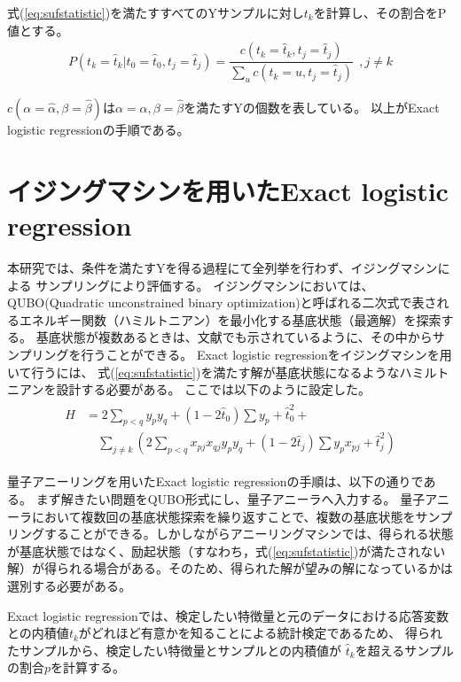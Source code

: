 \documentclass[12pt, dvipdfmx]{jmaster}
\theoremstyle{definition}
\begin{document}
式(\ref{eq:sufstatistic})を満たすすべてのYサンプルに対し$t_k$を計算し、その割合をΡ値とする。
\begin{eqnarray}
P(t_k　=　\hat{t}_k | t_0=\hat{t}_0,t_j=\hat{t}_j) = \dfrac{c( t_k=\hat{t}_k, t_j=\hat{t}_j)}{\sum_{u} c( t_k=u, t_j=\hat{t}_j)} ~~ ,j \neq k
\end{eqnarray}

$c(\alpha=\hat{\alpha}, \beta=\hat{\beta})$は$\alpha=\hat{\alpha}, \beta= \hat{\beta}$を満たすYの個数を表している。
以上がExact logistic regressionの手順である。

\section{イジングマシンを用いたExact logistic regression}
本研究では、条件を満たすYを得る過程にて全列挙を行わず、イジングマシンによる
サンプリングにより評価する。
イジングマシンにおいては、
QUBO(Quadratic unconstrained binary optimization)と呼ばれる二次式で表されるエネルギー関数（ハミルトニアン）を最小化する基底状態（最適解）を探索する。
基底状態が複数あるときは、文献\cite{sundar2019quantum}でも示されているように、その中からサンプリングを行うことができる。
Exact logistic regressionをイジングマシンを用いて行うには、
式(\ref{eq:sufstatistic})を満たす解が基底状態になるようなハミルトニアンを設計する必要がある。
ここでは以下のように設定した。
\begin{eqnarray}
	\begin{split}
H &= 2\sum_{p<q}y_py_q + (1-2\hat{t}_0)\sum y_p + \hat{t}_0^2 +\\
		& \quad \sum_{j \neq k}(2 \sum_{p < q}x_{pj} x_{qj} y_p y_q + (1-2 \hat{t}_j) \sum y_p x_{pj} + \hat{t}_j^2)
	\end{split}
\end{eqnarray}

量子アニーリングを用いたExact logistic regressionの手順は、以下の通りである。
まず解きたい問題をQUBO形式にし、量子アニーラへ入力する。
量子アニーラにおいて複数回の基底状態探索を繰り返すことで、複数の基底状態をサンプリングすることができる。しかしながらアニーリングマシンでは、得られる状態が基底状態ではなく、励起状態（すなわち，式(\ref{eq:sufstatistic})が満たされない解）が得られる場合がある。そのため、得られた解が望みの解になっているかは選別する必要がある。

Exact logistic regressionでは、検定したい特徴量と元のデータにおける応答変数との内積値$t_k$がどれほど有意かを知ることによる統計検定であるため、
得られたサンプルから、検定したい特徴量とサンプルとの内積値が
$\hat{t}_k$を超えるサンプルの割合$p$を計算する。
\end{document}
